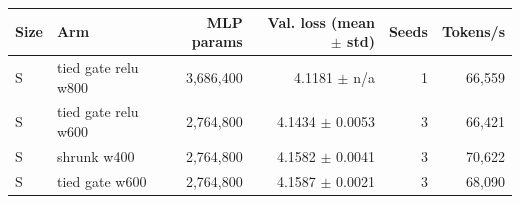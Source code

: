 \begin{tabular}{llrrrr}
\toprule
Size & Arm & MLP params & Val. loss (mean $\pm$ std) & Seeds & Tokens/s \\
\midrule
S & tied gate relu w800 & 3,686,400 & 4.1181 $\pm$ n/a & 1 & 66,559 \\
S & tied gate relu w600 & 2,764,800 & 4.1434 $\pm$ 0.0053 & 3 & 66,421 \\
S & shrunk w400 & 2,764,800 & 4.1582 $\pm$ 0.0041 & 3 & 70,622 \\
S & tied gate w600 & 2,764,800 & 4.1587 $\pm$ 0.0021 & 3 & 68,090 \\
\bottomrule
\end{tabular}

